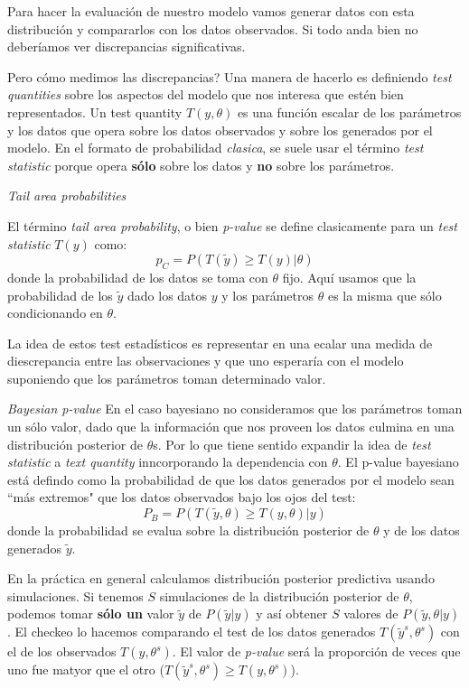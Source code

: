 \documentclass[aps,onecolumn,12pt,notitlepage]{revtex4-2}
\begin{document}
Para hacer la evaluación de nuestro modelo vamos generar datos con esta distribución y compararlos con los datos observados. Si todo anda bien no deberíamos ver discrepancias significativas.

Pero cómo medimos las discrepancias? Una manera de hacerlo es definiendo \textit{test quantities} sobre los aspectos del modelo que nos interesa que estén bien representados. Un test quantity $T(y,\theta)$ es una función escalar de los parámetros y los datos que opera sobre los datos observados y sobre los generados por el modelo. En el formato de probabilidad \textit{clasica}, se suele usar el término \textit{test statistic} porque opera \textbf{sólo} sobre los datos y \textbf{no} sobre los parámetros.

\textit{Tail area probabilities}

El término \textit{tail area probability}, o bien \textit{p-value} se define clasicamente para un \textit{test statistic} $T(y)$ como:
\begin{equation}
p_{C} = P(T(\tilde{y})\geq T(y)|\theta)
\end{equation}
donde la probabilidad de los datos se toma con $\theta$ fijo. Aquí usamos que la probabilidad de los $\tilde{y}$ dado los datos $y$ y los parámetros $\theta$ es la misma que sólo condicionando en $\theta$.

La idea de estos test estadísticos es representar en una ecalar una medida de diescrepancia entre las observaciones y que uno esperaría con el modelo suponiendo que los parámetros toman determinado valor.

\textit{Bayesian p-value}
En el caso bayesiano no consideramos que los parámetros toman un sólo valor, dado que la información que nos proveen los datos culmina en una distribución posterior de $\theta$s. Por lo que tiene sentido expandir la idea de \textit{test statistic} a \textit{text quantity} inncorporando la dependencia con $\theta$. El p-value bayesiano está defindo como la probabilidad de que los datos generados por el modelo sean ``más extremos" que los datos observados bajo los ojos del test:
\begin{equation}
P_{B} = P(T(\tilde{y},\theta)\geq T(y,\theta)|y)
\end{equation}
donde la probabilidad se evalua sobre la distribución posterior de $\theta$ y de los datos generados $\tilde{y}$.

En la práctica en general calculamos distribución posterior predictiva usando simulaciones. Si tenemos $S$ simulaciones de la distribución posterior de $\theta$, podemos tomar \textbf{sólo un} valor $\tilde{y}$ de $P(\tilde{y}|y)$ y así
obtener $S$ valores de $P(\tilde{y},\theta|y)$. El checkeo lo hacemos comparando el test de los datos generados $T(\tilde{y}^{s},\theta^{s})$ con el de los observados $T(y,\theta^{s})$. El valor de \textit{p-value} será la proporción de veces que uno fue matyor que el otro ($T(\tilde{y}^{s},\theta^{s}) \geq T(y,\theta^{s})$).
\end{document}
